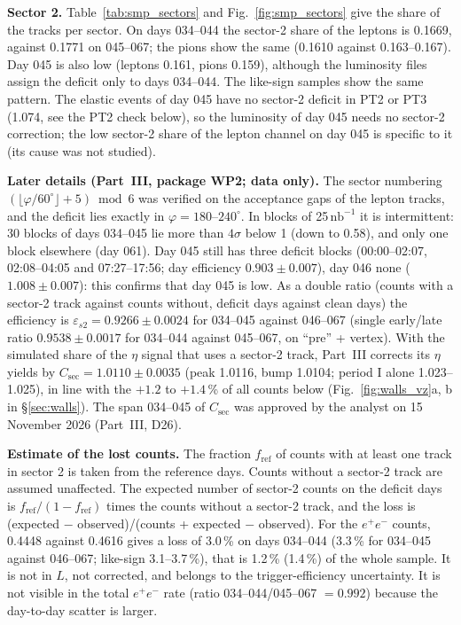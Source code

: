 \documentclass[11pt,a4paper]{article}
\newcommand{\ee}{\ensuremath{e^{+}e^{-}}\xspace}
\newcommand{\nbinv}{\ensuremath{\mathrm{nb}^{-1}}\xspace}
\begin{document}
\textbf{Sector 2.} Table~\ref{tab:smp_sectors} and Fig.~\ref{fig:smp_sectors} give the share of the tracks
per sector. On days 034--044 the sector-2 share of the leptons is 0.1669, against 0.1771 on 045--067; the
pions show the same (0.1610 against 0.163--0.167). Day 045 is also low (leptons 0.161, pions 0.159), although
the luminosity files assign the deficit only to days 034--044. The like-sign samples show the same pattern. The elastic events of day 045
have no sector-2 deficit in PT2 or PT3 (1.074, see the PT2 check below), so the luminosity of day 045 needs no sector-2 correction; the
low sector-2 share of the lepton channel on day 045 is specific to it (its cause was not studied).

\textbf{Later details (Part~III, package WP2; data only).} The sector numbering $(\lfloor\varphi/60^\circ\rfloor+5)\bmod6$ was verified on
the acceptance gaps of the lepton tracks, and the deficit lies exactly in $\varphi=180$--$240^\circ$. In blocks of 25\,\nbinv it is
intermittent: 30 blocks of days 034--045 lie more than $4\sigma$ below 1 (down to 0.58), and only one block elsewhere (day 061). Day 045
still has three deficit blocks (00:00--02:07, 02:08--04:05 and 07:27--17:56; day efficiency $0.903\pm0.007$), day 046 none ($1.008\pm0.007$):
this confirms that day 045 is low. As a double ratio (counts with a sector-2 track against counts without, deficit days against clean days)
the efficiency is $\varepsilon_{s2}=0.9266\pm0.0024$ for 034--045 against 046--067 (single early/late ratio $0.9538\pm0.0017$ for 034--044 against
045--067, on ``pre'' + vertex). With the simulated share of the $\eta$ signal that uses a sector-2 track, Part~III corrects its $\eta$ yields
by $C_{\mathrm{sec}}=1.0110\pm0.0035$ (peak 1.0116, bump 1.0104; period I alone 1.023--1.025), in line with the $+1.2$ to $+1.4$\,\% of all counts
below (Fig.~\ref{fig:walls_vz}a, b in \S\ref{sec:walls}).
The span 034--045 of $C_{\mathrm{sec}}$ was approved by the analyst on 15 November 2026 (Part~III, D26).


\textbf{Estimate of the lost counts.} The fraction $f_{\mathrm{ref}}$ of counts with at least one track in sector 2 is
taken from the reference days. Counts without a sector-2 track are assumed unaffected. The expected number of
sector-2 counts on the deficit days is $f_{\mathrm{ref}}/(1-f_{\mathrm{ref}})$ times the counts without a
sector-2 track, and the loss is (expected $-$ observed)/(counts + expected $-$ observed). For the \ee counts,
0.4448 against 0.4616 gives a loss of 3.0\,\% on days 034--044 (3.3\,\% for 034--045 against 046--067;
like-sign 3.1--3.7\,\%), that is 1.2\,\% (1.4\,\%) of the whole sample. It is not in $L$, not corrected,
and belongs to the trigger-efficiency uncertainty. It is not visible in the total \ee rate (ratio
034--044/045--067 $=0.992$) because the day-to-day scatter is larger.
\end{document}
